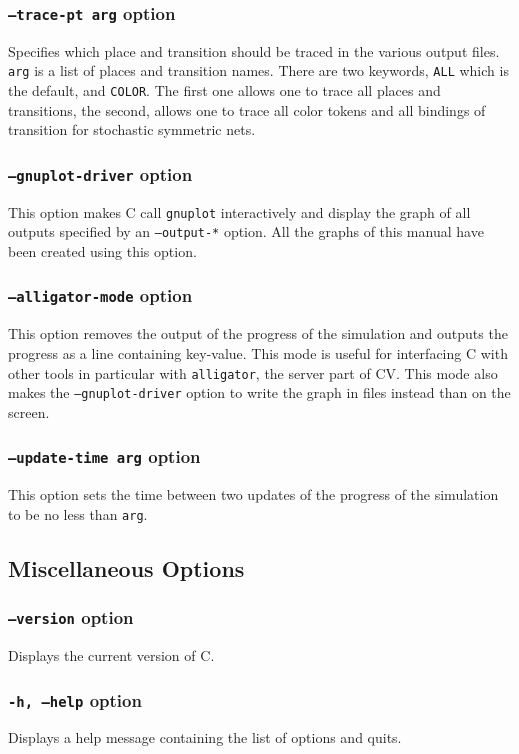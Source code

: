 \documentclass{article}
\newcommand{\cosmos}{\mbox{\textup{C}\scalebox{0.75}{{\textsc{OSMOS}}}}}
\newcommand{\cosyverif}{\mbox{\textup{C}\scalebox{0.75}{{\textsc{OSY}}}\textup{V}\scalebox{0.75}{{\textsc{ERIF}}}}}
\begin{document}
\subsubsection{\texttt{--trace-pt arg} option}
Specifies which place and transition should be traced in the various
output files.  \texttt{arg} is a list of places and transition
names. There are two keywords, \texttt{ALL} which is the default, and
\texttt{COLOR}. The first one allows one to trace all places and transitions,
the second, allows one to trace all color tokens and all bindings of
transition for stochastic symmetric nets.

\subsubsection{\texttt{--gnuplot-driver} option}
This option makes \cosmos{} call \texttt{gnuplot} interactively and
display the graph of all outputs specified by an \texttt{--output-*}
option.  All the graphs of this manual have been created using this
option.

\subsubsection{\texttt{--alligator-mode} option}
This option removes the output of the progress of the simulation 
and outputs the progress as a line containing key-value. This mode
is useful for interfacing \cosmos{} with other tools in particular 
with \texttt{alligator}, the server part of \cosyverif. This 
mode also makes the \texttt{--gnuplot-driver} option to write
the graph in files instead than on the screen.

\subsubsection{\texttt{--update-time arg} option}
This option sets the time between two updates of the progress of the simulation
to be no less than \texttt{arg}.

\subsection{Miscellaneous Options}
\subsubsection{\texttt{--version} option}
Displays the current version of \cosmos{}.

\subsubsection{\texttt{-h, --help} option}
Displays a help message containing the list of options and quits.
\end{document}
